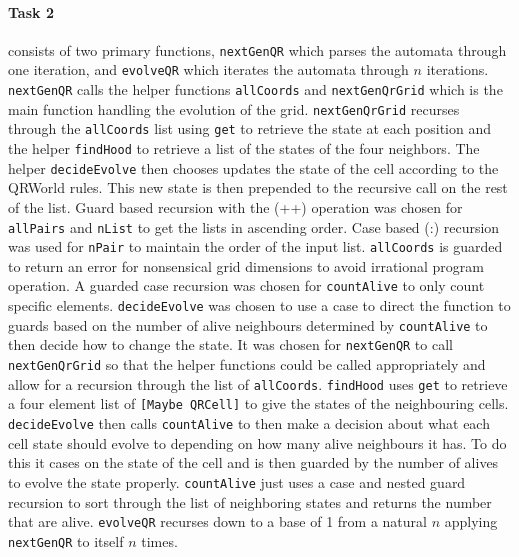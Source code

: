 \documentclass[11pt]{article}
\begin{document}
\paragraph{Task 2} consists of two primary functions, \verb|nextGenQR| which parses the automata through one iteration, and \verb|evolveQR| which iterates the automata through $n$ iterations. \verb|nextGenQR| calls the helper functions \verb|allCoords| and \verb|nextGenQrGrid| which is the main function handling the evolution of the grid. \verb|nextGenQrGrid| recurses through the \verb|allCoords| list using \verb|get| to retrieve the state at each position and the helper \verb|findHood| to retrieve a list of the states of the four neighbors. The helper \verb|decideEvolve| then chooses updates the state of the cell according to the QRWorld rules. This new state is then prepended to the recursive call on the rest of the list. Guard based recursion with the (++) operation was chosen for \verb|allPairs| and \verb|nList| to get the lists in ascending order. Case based (:) recursion was used for \verb|nPair| to maintain the order of the input list. \verb|allCoords| is guarded to return an error for nonsensical grid dimensions to avoid irrational program operation. A guarded case recursion was chosen for \verb|countAlive| to only count specific elements. \verb|decideEvolve| was chosen to use a case to direct the function to guards based on the number of alive neighbours determined by \verb|countAlive| to then decide how to change  the state. It was chosen for \verb|nextGenQR| to call \verb|nextGenQrGrid| so that the helper functions could be called appropriately and allow for a recursion through the list of \verb|allCoords|. \verb|findHood| uses \verb|get| to retrieve a four element list of \verb|[Maybe QRCell]| to give the states of the neighbouring cells. \verb|decideEvolve| then calls \verb|countAlive| to then make a decision about what each cell state should evolve to depending on how many alive neighbours it has. To do this it cases on the state of the cell and is then guarded by the number of alives to evolve the state properly. \verb|countAlive| just uses a case and nested guard recursion to sort through the list of neighboring states and returns the number that are alive. \verb|evolveQR| recurses down to a base of 1 from a natural $n$ applying \verb|nextGenQR| to itself $n$ times.

\newpage
\end{document}
